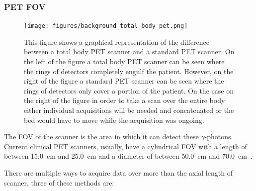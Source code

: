             \subsubsection{PET FOV} \label{sec:pet_fov}
                \begin{figure}
                    \centering
                    
                    \texttt{[image: figures/background\_total\_body\_pet.png]}
                    
                    \captionsetup{singlelinecheck=false, justification=raggedright}
                    \caption{This figure shows a graphical representation of the difference between a total body \gls{PET} scanner and a standard \gls{PET} scanner. On the left of the figure a total body \gls{PET} scanner can be seen where the rings of detectors completely engulf the patient. However, on the right of the figure a standard \gls{PET} scanner can be seen where the rings of detectors only cover a portion of the patient. On the case on the right of the figure in order to take a scan over the entire body either individual acquisitions will be needed and concatenated or the bed would have to move while the acquisition was ongoing.} \label{fig:pet_fov_total_body_pet}
                \end{figure}
                
                The \gls{FOV} of the scanner is the area in which it can detect these $\gamma$-photons. Current clinical \gls{PET} scanners, usually, have a cylindrical \gls{FOV} with a length of between \SI{15.0}{\centi\metre} and \SI{25.0}{\centi\metre} and a diameter of between \SI{50.0}{\centi\metre} and \SI{70.0}{\centi\metre}~.
                
                There are multiple ways to acquire data over more than the axial length of scanner, three of these methods are:
                
